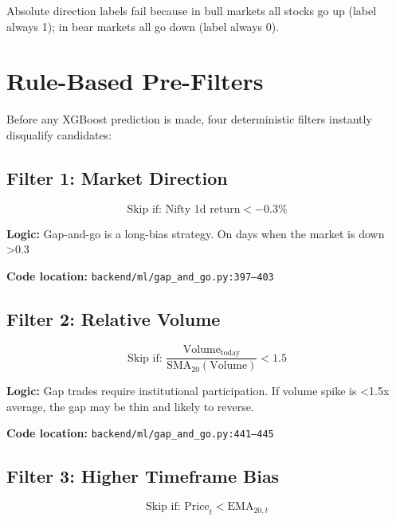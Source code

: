 \documentclass[11pt,a4paper]{article}
\begin{document}
Absolute direction labels fail because in bull markets all stocks go up (label always 1); in bear markets all go down (label always 0).

\section{Rule-Based Pre-Filters}

Before any XGBoost prediction is made, four deterministic filters instantly disqualify candidates:

\subsection{Filter 1: Market Direction}

\begin{equation}
\text{Skip if: Nifty 1d return} < -0.3\%
\end{equation}

\textbf{Logic:} Gap-and-go is a long-bias strategy. On days when the market is down >0.3%

\textbf{Code location:} \texttt{backend/ml/gap\_and\_go.py:397–403}

\subsection{Filter 2: Relative Volume}

\begin{equation}
\text{Skip if: } \frac{\text{Volume}_{\text{today}}}{\text{SMA}_{20}(\text{Volume})} < 1.5
\end{equation}

\textbf{Logic:} Gap trades require institutional participation. If volume spike is <1.5x average, the gap may be thin and likely to reverse.

\textbf{Code location:} \texttt{backend/ml/gap\_and\_go.py:441–445}

\subsection{Filter 3: Higher Timeframe Bias}

\begin{equation}
\text{Skip if: Price}_t < \text{EMA}_{20,t}
\end{equation}
\end{document}
